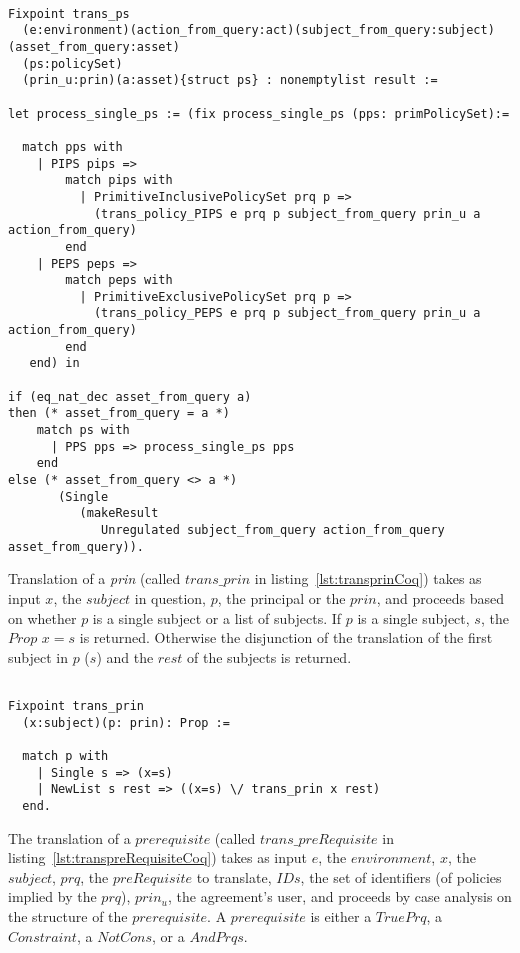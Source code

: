 \begin{lstlisting}

Fixpoint trans_ps
  (e:environment)(action_from_query:act)(subject_from_query:subject)(asset_from_query:asset)
  (ps:policySet)
  (prin_u:prin)(a:asset){struct ps} : nonemptylist result :=

let process_single_ps := (fix process_single_ps (pps: primPolicySet):=
  
  match pps with 
    | PIPS pips => 
        match pips with 
          | PrimitiveInclusivePolicySet prq p => 
            (trans_policy_PIPS e prq p subject_from_query prin_u a action_from_query)                
        end
    | PEPS peps => 
        match peps with 
          | PrimitiveExclusivePolicySet prq p => 
            (trans_policy_PEPS e prq p subject_from_query prin_u a action_from_query)
        end  
   end) in

if (eq_nat_dec asset_from_query a)
then (* asset_from_query = a *)  
    match ps with
      | PPS pps => process_single_ps pps
    end
else (* asset_from_query <> a *)
       (Single 
          (makeResult 
             Unregulated subject_from_query action_from_query asset_from_query)).
\end{lstlisting}



Translation of a \emph{prin} (called $trans\_prin$ in listing~\ref{lst:transprinCoq}) takes as input $x$, the $subject$ in question, $p$, the principal or the $prin$,  and proceeds based on whether $p$ is a single subject or a list of subjects. If $p$ is a single subject, $s$, the $Prop$ $x=s$ is returned. Otherwise the disjunction of the translation of the first subject in $p$ ($s$) and the $rest$ of the subjects is returned.

\begin{lstlisting}

Fixpoint trans_prin
  (x:subject)(p: prin): Prop :=

  match p with
    | Single s => (x=s)
    | NewList s rest => ((x=s) \/ trans_prin x rest)
  end.
\end{lstlisting}



The translation of a $prerequisite$ (called $trans\_preRequisite$ in listing~\ref{lst:transpreRequisiteCoq}) takes as input $e$, the $environment$, $x$, the $subject$, $prq$, the $preRequisite$ to translate, $IDs$, the set of identifiers (of policies implied by the $prq$), $prin_{u}$, the agreement's user, and proceeds by case analysis on the structure of the $prerequisite$. A $prerequisite$ is either a $TruePrq$, a $Constraint$, a $NotCons$, or a $AndPrqs$. 

